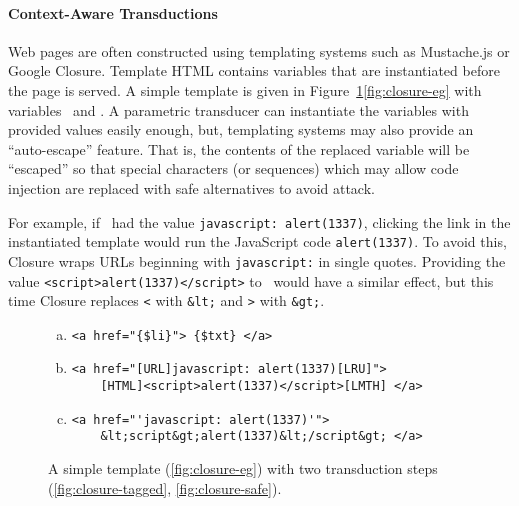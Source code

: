 
\paragraph{Context-Aware Transductions}

Web pages are often constructed using templating systems such as Mustache.js or Google Closure.
Template HTML contains variables that are instantiated before the page is served.
A simple template is given in Figure~\ref{fig:closure}\ref{fig:closure-eg} with variables \linkvar\ and \linktextvar.
A parametric transducer can instantiate the variables with provided values easily enough, but, templating systems may also provide an ``auto-escape'' feature.
That is, the contents of the replaced variable will be ``escaped'' so that special characters (or sequences) which may allow code injection are replaced with safe alternatives to avoid attack.

For example, if \linkvar\ had the value \texttt{javascript: alert(1337)}, clicking the link in the instantiated template would run the JavaScript code \texttt{alert(1337)}.
To avoid this, Closure wraps URLs beginning with \texttt{javascript:} in single quotes.
Providing the value \texttt{<script>alert(1337)</script>} to \linktextvar\ would have a similar effect, but this time Closure replaces \texttt{<} with \texttt{\&lt;} and \texttt{>} with \texttt{\&gt;}.

\begin{figure}
\begin{center}
\begin{minipage}{.75\linewidth}
\begin{enumerate}[(a)]
\item \label{fig:closure-eg}
\begin{verbatim}
<a href="{$li}"> {$txt} </a>
\end{verbatim}
\item \label{fig:closure-tagged}
\begin{verbatim}
<a href="[URL]javascript: alert(1337)[LRU]">
    [HTML]<script>alert(1337)</script>[LMTH] </a>
\end{verbatim}
\item \label{fig:closure-safe}
\begin{verbatim}
<a href="'javascript: alert(1337)'">
    &lt;script&gt;alert(1337)&lt;/script&gt; </a>
\end{verbatim}
\end{enumerate}
\end{minipage}
\end{center}
\vspace{-3ex}
\caption{\label{fig:closure}A simple template (\ref{fig:closure-eg}) with two transduction steps (\ref{fig:closure-tagged}, \ref{fig:closure-safe}).}
\end{figure}

